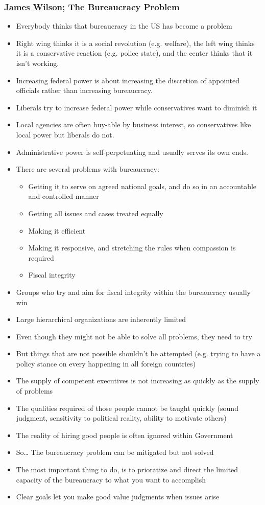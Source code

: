 \documentclass[11pt]{article}
\begin{document}
\subsubsection{\href{20200530205839-james\_wilson.org}{James Wilson}; The Bureaucracy Problem}
\label{sec:orgc3d9389}
\begin{itemize}
\item Everybody thinks that bureaucracy in the US has become a problem
\item Right wing thinks it is a social revolution (e.g. welfare), the left wing
thinks it is a conservative reaction (e.g. police state), and the center
thinks that it isn't working.
\item Increasing federal power is about increasing the discretion of appointed
officials rather than increasing bureaucracy.
\item Liberals try to increase federal power while conservatives want to diminish it
\item Local agencies are often buy-able by business interest, so conservatives like
local power but liberals do not.
\item Administrative power is self-perpetuating and usually serves its own ends.
\item There are several problems with bureaucracy:
\begin{itemize}
\item Getting it to serve on agreed national goals, and do so in an accountable
and controlled manner
\item Getting all issues and cases treated equally
\item Making it efficient
\item Making it responsive, and stretching the rules when compassion is required
\item Fiscal integrity
\end{itemize}
\item Groups who try and aim for fiscal integrity within the bureaucracy usually win
\item Large hierarchical organizations are inherently limited
\item Even though they might not be able to solve all problems, they need to try
\item But things that are not possible shouldn't be attempted (e.g. trying to have a
policy stance on every happening in all foreign countries)
\item The supply of competent executives is not increasing as quickly as the supply
of problems
\item The qualities required of those people cannot be taught quickly (sound
judgment, sensitivity to political reality, ability to motivate others)
\item The reality of hiring good people is often ignored within Government
\item So\ldots{} The bureaucracy problem can be mitigated but not solved
\item The most important thing to do, is to prioratize and direct the limited
capacity of the bureaucracy to what you want to accomplish
\item Clear goals let you make good value judgments when issues arise
\end{itemize}
\end{document}

